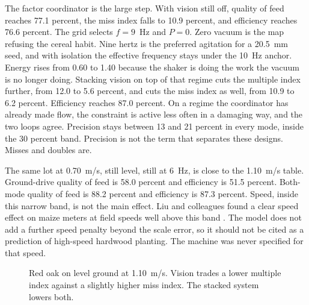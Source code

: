 The factor coordinator is the large step. With vision still off, quality of feed reaches 77.1 percent, the miss index falls to 10.9 percent, and efficiency reaches 76.6 percent. The grid selects $f=9$~Hz and $P=0$. Zero vacuum is the map refusing the cereal habit. Nine hertz is the preferred agitation for a 20.5~mm seed, and with isolation the effective frequency stays under the 10~Hz anchor. Energy rises from 0.60 to 1.40 because the shaker is doing the work the vacuum is no longer doing. Stacking vision on top of that regime cuts the multiple index further, from 12.0 to 5.6 percent, and cuts the miss index as well, from 10.9 to 6.2 percent. Efficiency reaches 87.0 percent. On a regime the coordinator has already made flow, the constraint is active less often in a damaging way, and the two loops agree. Precision stays between 13 and 21 percent in every mode, inside the 30 percent band. Precision is not the term that separates these designs. Misses and doubles are.

The same lot at 0.70~m/s, still level, still at 6~Hz, is close to the 1.10~m/s table. Ground-drive quality of feed is 58.0 percent and efficiency is 51.5 percent. Both-mode quality of feed is 88.2 percent and efficiency is 87.3 percent. Speed, inside this narrow band, is not the main effect. Liu and colleagues found a clear speed effect on maize meters at field speeds well above this band \cite{liu2017speed}. The model does not add a further speed penalty beyond the scale error, so it should not be cited as a prediction of high-speed hardwood planting. The machine was never specified for that speed.

\begin{figure}[htbp]
\centering
{}
\caption{Red oak on level ground at 1.10~m/s. Vision trades a lower multiple index against a slightly higher miss index. The stacked system lowers both.}
\label{fig:redbars}
\end{figure}

